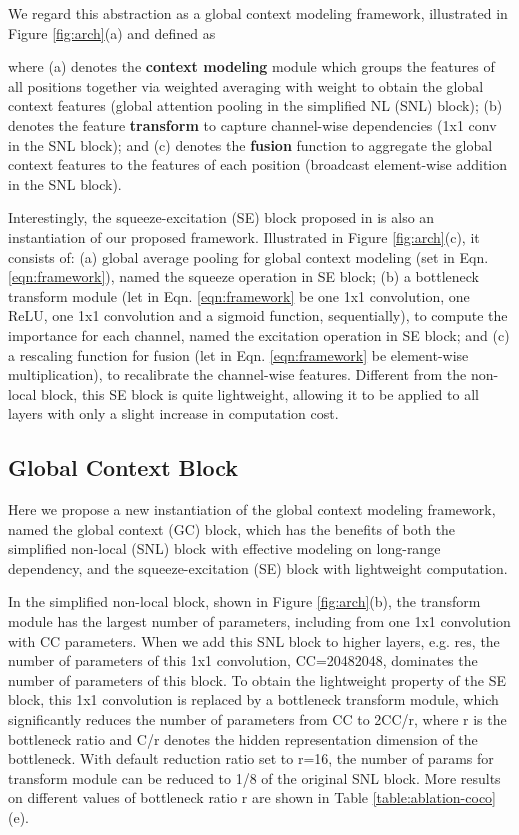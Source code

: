 \documentclass[10pt,twocolumn,letterpaper]{article}
\begin{document}
We regard this abstraction as a global context modeling framework, illustrated in Figure \ref{fig:arch}(a) and defined as

where (a)  denotes the \textbf{context modeling} module which groups the features of all positions together via weighted averaging with weight  to obtain the global context features (global attention pooling in the simplified NL (SNL) block);
(b)  denotes the feature \textbf{transform} to capture channel-wise dependencies (1x1 conv in the SNL block); 
and (c)  denotes the \textbf{fusion} function to aggregate the global context features to the features of each position (broadcast element-wise addition in the SNL block).


Interestingly, the squeeze-excitation (SE) block proposed in \cite{hu2018senet} is also an instantiation of our proposed framework. Illustrated in Figure \ref{fig:arch}(c), it consists of: 
(a) global average pooling for global context modeling (set  in Eqn. \ref{eqn:framework}), named the squeeze operation in SE block; 
(b) a bottleneck transform module (let  in Eqn. \ref{eqn:framework} be one 1x1 convolution, one ReLU, one 1x1 convolution and a sigmoid function, sequentially), to compute the importance for each channel, named the excitation operation in SE block; and 
(c) a rescaling function for fusion (let  in Eqn. \ref{eqn:framework} be element-wise multiplication), to recalibrate the channel-wise features.
Different from the non-local block, this SE block is quite lightweight, allowing it to be applied to all layers with only a slight increase in computation cost.

\subsection{Global Context Block}
Here we propose a new instantiation of the global context modeling framework, named the global context (GC) block, which has the benefits of both the simplified non-local (SNL) block with effective modeling on long-range dependency, and the squeeze-excitation (SE) block with lightweight computation.

In the simplified non-local block, shown in Figure \ref{fig:arch}(b), the transform module has the largest number of parameters, including from one 1x1 convolution with CC parameters.
When we add this SNL block to higher layers, e.g. res, the number of parameters of this 1x1 convolution, CC=20482048, dominates the number of parameters of this block.
To obtain the lightweight property of the SE block, this 1x1 convolution is replaced by a bottleneck transform module, which significantly reduces the number of parameters from CC to 2CC/r, where r is the bottleneck ratio and C/r denotes the hidden representation dimension of the bottleneck.
With default reduction ratio set to r=16, the number of params for transform module can be reduced to 1/8 of the original SNL block. More results on different values of bottleneck ratio r are shown in Table \ref{table:ablation-coco}(e).
\end{document}
